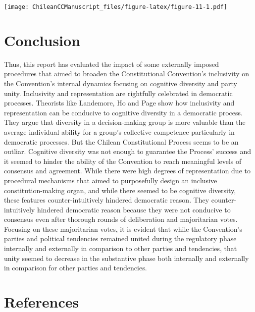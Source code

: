 \documentclass[
]{article}
\begin{document}
\texttt{[image: ChileanCCManuscript\_files/figure-latex/figure-11-1.pdf]}

\hypertarget{conclusion}{%
\section{Conclusion}\label{conclusion}}

Thus, this report has evaluated the impact of some externally imposed
procedures that aimed to broaden the Constitutional Convention's
inclusivity on the Convention's internal dynamics focusing on cognitive
diversity and party unity. Inclusivity and representation are rightfully
celebrated in democratic processes. Theorists like Landemore, Ho and
Page show how inclusivity and representation can be conducive to
cognitive diversity in a democratic process. They argue that diversity
in a decision-making group is more valuable than the average individual
ability for a group's collective competence particularly in democratic
processes. But the Chilean Constitutional Process seems to be an
outliar. Cognitive diversity was not enough to guarantee the Process'
success and it seemed to hinder the ability of the Convention to reach
meaningful levels of consensus and agreement. While there were high
degrees of representation due to procedural mechanisms that aimed to
purposefully design an inclusive constitution-making organ, and while
there seemed to be cognitive diversity, these features
counter-intuitively hindered democratic reason. They counter-intuitively
hindered democratic reason because they were not conducive to consensus
even after thorough rounds of deliberation and majoritarian votes.
Focusing on these majoritarian votes, it is evident that while the
Convention's parties and political tendencies remained united during the
regulatory phase internally and externally in comparison to other
parties and tendencies, that unity seemed to decrease in the substantive
phase both internally and externally in comparison for other parties and
tendencies.

\hypertarget{references}{%
\section{References}\label{references}}
\end{document}
